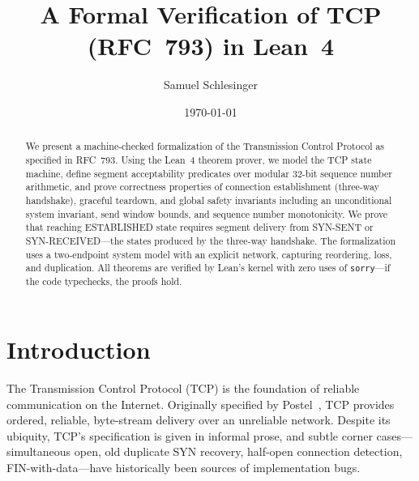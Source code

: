 \documentclass[11pt]{article}
\title{A Formal Verification of TCP (RFC~793) in Lean~4}
\author{Samuel Schlesinger}
\date{\today}
\theoremstyle{definition}
\begin{document}
\maketitle

\begin{abstract}
We present a machine-checked formalization of the Transmission Control
Protocol as specified in RFC~793. Using the Lean~4 theorem prover, we model
the TCP state machine, define segment acceptability predicates over modular
32-bit sequence number arithmetic, and prove correctness properties of
connection establishment (three-way handshake), graceful teardown, and global
safety invariants including an unconditional system invariant, send window
bounds, and sequence number monotonicity. We prove that reaching ESTABLISHED
state requires segment delivery from SYN-SENT or SYN-RECEIVED---the states
produced by the three-way handshake. The formalization uses a two-endpoint
system model with an explicit network, capturing reordering, loss, and
duplication. All theorems are verified by Lean's kernel with zero uses of
\texttt{sorry}---if the code typechecks, the proofs hold.
\end{abstract}

\tableofcontents

\section{Introduction}
\label{sec:introduction}

The Transmission Control Protocol (TCP) is the foundation of reliable
communication on the Internet. Originally specified by Postel~\cite{rfc793},
TCP provides ordered, reliable, byte-stream delivery over an unreliable
network. Despite its ubiquity, TCP's specification is given in informal prose,
and subtle corner cases---simultaneous open, old duplicate SYN recovery,
half-open connection detection, FIN-with-data---have historically been sources
of implementation bugs.
\end{document}
